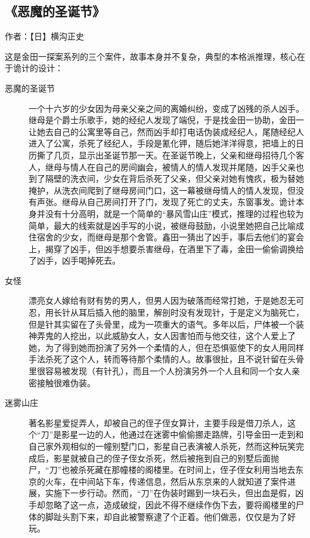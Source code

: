 \subsection{《恶魔的圣诞节》}

作者：【日】横沟正史

这是金田一探案系列的三个案件，故事本身并不复杂，典型的本格派推理，核心在于诡计的设计：
\begin{description}
    \item[恶魔的圣诞节] 一个十六岁的少女因为母亲父亲之间的离婚纠纷，变成了凶残的杀人凶手。继母是个爵士乐歌手，她的经纪人发现了端倪，于是找金田一协助，金田一让她去自己的公寓里等自己，然而凶手却打电话伪装成经纪人，尾随经纪人进入了公寓，杀死了经纪人，手段是氰化钾，随后她洋洋得意，把墙上的日历撕了几页，显示出圣诞节那一天。在圣诞节晚上，父亲和继母招待几个客人，继母与情人在自己的房间幽会，被情人的情人发现并尾随，凶手父亲也到了隔壁的洗衣间，少女在背后杀死了父亲，但父亲对她有愧疚，极为替她掩护，从洗衣间爬到了继母房间门口，这一幕被继母情人的情人发现，但没有声张。继母从自己房间打开了门，发现了死亡的丈夫，东窗事发。诡计本身并没有十分高明，就是一个简单的“暴风雪山庄”模式，推理的过程也较为简单，最大的线索就是凶手写的小说，被继母鼓励，小说里她把自己比喻成住宿舍的少女，而继母是那个舍管。鑫田一猜出了凶手，事后去他们的宴会上，揭穿了凶手，但凶手想要杀害继母，在酒里下了毒，金田一偷偷调换给了凶手，凶手喝掉死去。
    \item[女怪] 漂亮女人嫁给有财有势的男人，但男人因为破落而经常打她，于是她忍无可忍，用长针从耳后插入他的脑里，解剖时没有发现针，于是定义为脑死亡，但是针其实留在了头骨里，成为一项重大的语气。多年以后，尸体被一个装神弄鬼的人挖出，以此威胁女人，女人因害怕而与他交往，这个人爱上了她，为了得到她而扮演了另外一个柔情的人，但在恐惧驱使下的女人用同样手法杀死了这个人，转而等待那个柔情的人。故事很扯，且不说针留在头骨里很容易被发现（有针孔），而且一个人扮演另外一个人且和同一个女人亲密接触很难伪装。
    \item[迷雾山庄] 著名影星爱捉弄人，却被自己的侄子侄女算计，主要手段是借刀杀人，这个“刀”是影星一边的人，他通过在迷雾中偷偷挪走路牌，引导金田一走到和自己家外观相似的一幢别墅门口，影星自己表演被人杀死，然而这种玩笑完成后，影星就被自己的侄子侄女杀死，然后被拖到自己的别墅后面抛尸，“刀”也被杀死藏在那幢楼的阁楼里。在时间上，侄子侄女利用当地去东京的火车，在中间站下车，传递信息，然后从东京来的人就知道了案件进展，实施下一步行动。然而，“刀”在伪装时踢到一块石头，但出血是假，凶手却忽略了这一点，造成破绽，因此不得不继续作伪下去，要将阁楼里的尸体的脚趾头割下来，却自此被警察逮了个正着。他们做恶，仅仅是为了好玩。
\end{description}

